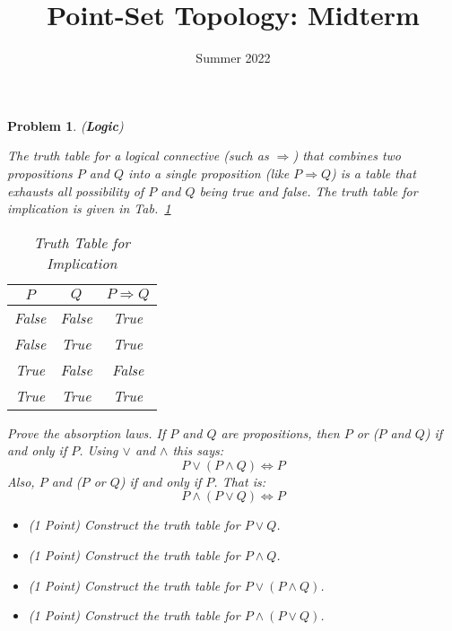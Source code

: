 \documentclass{article}
\title{Point-Set Topology: Midterm}
\date{Summer 2022}
\theoremstyle{normal}
\newtheorem{problem}{Problem}
\begin{document}
    \maketitle
    \begin{problem}
        (\textbf{Logic})
        \par\hfill\par
        The truth table for a logical connective (such as $\Rightarrow$) that
        combines two propositions $P$ and $Q$ into a single proposition
        (like $P\Rightarrow{Q}$) is a table that exhausts all possibility of
        $P$ and $Q$ being true and false. The truth table for implication is
        given in Tab.~\ref{tab:truth_table_implication}
        \begin{table}[H]
            \centering
            \begin{tabular}{ c | c | c }
                $P$&$Q$&$P\Rightarrow{Q}$\\
                \hline
                False&False&True\\
                False&True&True\\
                True&False&False\\
                True&True&True
            \end{tabular}
            \caption{Truth Table for Implication}
            \label{tab:truth_table_implication}
        \end{table}
        Prove the absorption laws. If $P$ and $Q$ are propositions, then
        $P$ \textit{or} ($P$ \textit{and} $Q$) if and only if $P$. Using
        $\lor$ and $\land$ this says:
        \begin{equation}
            P\lor(P\land{Q})\Leftrightarrow{P}
        \end{equation}
        Also, $P$ \textit{and} ($P$ \textit{or} $Q$) if and only if $P$.
        That is:
        \begin{equation}
            P\land(P\lor{Q})\Leftrightarrow{P}
        \end{equation}
        \begin{itemize}
            \item (1 Point) Construct the truth table for $P\lor{Q}$.
            \item (1 Point) Construct the truth table for $P\land{Q}$.
            \item (1 Point) Construct the truth table for $P\lor(P\land{Q})$.
            \item (1 Point) Construct the truth table for $P\land(P\lor{Q})$.

\end{itemize}
\end{problem}
\end{document}
